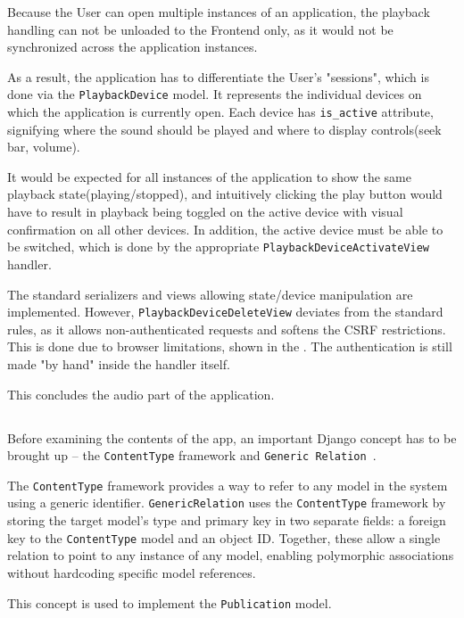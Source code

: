 Because the User can open multiple instances of an application, the playback handling can not be
unloaded to the Frontend only, as it would not be synchronized across the application instances.

As a result, the application has to differentiate the User's "sessions", which is done
via the \texttt{PlaybackDevice} model.
It represents the individual devices on which the application is currently open.
Each device has \texttt{is\_active} attribute, signifying where the sound should be played and where
to display controls(seek bar, volume).

It would be expected for all instances of the application to show the same playback state(playing/stopped),
and intuitively clicking the play button would have to result in playback being toggled on the active device with
visual confirmation on all other devices. In addition, the active device must be able to be switched, which is done
by the appropriate \texttt{PlaybackDeviceActivateView} handler.

The standard serializers and views allowing state/device manipulation are implemented.
However, \texttt{PlaybackDeviceDeleteView} deviates from the standard rules, as it allows non-authenticated requests
and softens the CSRF restrictions. This is done due to browser limitations, shown in the .
The authentication is still made "by hand" inside the handler itself.

This concludes the audio part of the application.

\subsection{}\label{subsec:social}
Before examining the contents of the  app, an important Django concept
has to be brought up -- the \texttt{ContentType} framework and \texttt{Generic Relation}~\cite{djangocontenttype}.

The \texttt{ContentType} framework provides a way to refer to any model in the system
using a generic identifier.
\texttt{GenericRelation} uses the \texttt{ContentType} framework by storing the target
model’s type and primary key in two separate fields: a foreign key to the
\texttt{ContentType} model and an object ID.
Together, these allow a single relation to point to any instance of any model,
enabling polymorphic associations without hardcoding specific model references.

This concept is used to implement the \texttt{Publication} model.

